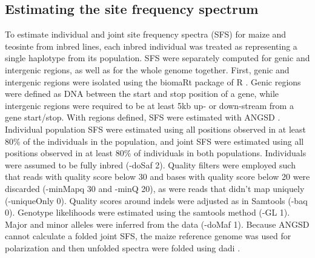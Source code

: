 \documentclass{pnastwo}
\begin{document}
\begin{article}
\begin{materials}
\subsection{Estimating the site frequency spectrum}
To estimate individual  and joint site frequency spectra (SFS) for maize and teosinte from inbred lines, each inbred individual was treated as representing a single haplotype from its population.
SFS were
separately computed for genic and intergenic regions, as well as for
the whole genome together. First, genic and intergenic regions were isolated using
the biomaRt package \cite{durinck2009,durinck2005} of R \cite{R2014}. Genic
regions were defined as DNA between the start and stop position of a
gene, while intergenic regions were required to be at least 5kb up- or
down-stream from a gene start/stop. With regions defined, SFS were
estimated with ANGSD \cite{korneliussen2014}. Individual population SFS were
estimated using all positions observed in at least 80\% of the
individuals in the population, and joint SFS were estimated using all
positions observed in at least 80\% of individuals in both
populations. Individuals were
assumed to be fully inbred (-doSaf 2). Quality filters were
employed such that reads with quality score below 30 and bases with
quality score below 20 were discarded (-minMapq 30 and -minQ 20), as were reads that didn't map
uniquely (-uniqueOnly 0). Quality scores around indels were adjusted
as in Samtools (-baq 0). Genotype likelihoods were estimated using the samtools
method (-GL 1). Major and minor alleles were inferred from the data
(-doMaf 1). Because ANGSD cannot calculate a folded joint SFS, the
maize reference genome was used for polarization and then unfolded spectra
were folded using dadi \cite{gutenkunst2009}.


\end{materials}
\end{article}
\end{document}
